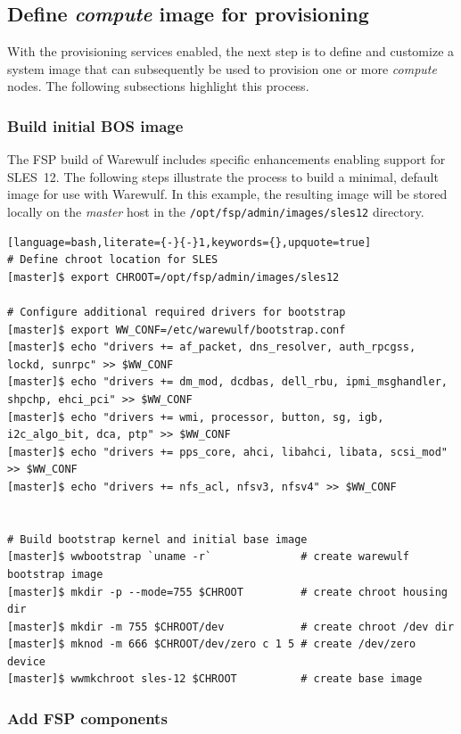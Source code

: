 \documentclass[letterpaper]{article}
\begin{document}
\subsection{Define {\em compute} image for provisioning}

With the provisioning services enabled, the next step is to define and
customize a system image that can subsequently be used to provision one or more
{\em compute} nodes. The following subsections highlight this process.

\subsubsection{Build initial BOS image}

The FSP build of Warewulf includes specific enhancements enabling support for
SLES~12. The following steps illustrate the process to build a minimal, default
image for use with Warewulf. In this example, the resulting image will be
stored locally on the {\em master} host in the
\texttt{/opt/fsp/admin/images/sles12} directory.

\begin{lstlisting}[language=bash,literate={-}{-}1,keywords={},upquote=true]
# Define chroot location for SLES 
[master]$ export CHROOT=/opt/fsp/admin/images/sles12

# Configure additional required drivers for bootstrap
[master]$ export WW_CONF=/etc/warewulf/bootstrap.conf
[master]$ echo "drivers += af_packet, dns_resolver, auth_rpcgss, lockd, sunrpc" >> $WW_CONF
[master]$ echo "drivers += dm_mod, dcdbas, dell_rbu, ipmi_msghandler, shpchp, ehci_pci" >> $WW_CONF
[master]$ echo "drivers += wmi, processor, button, sg, igb, i2c_algo_bit, dca, ptp" >> $WW_CONF
[master]$ echo "drivers += pps_core, ahci, libahci, libata, scsi_mod" >> $WW_CONF
[master]$ echo "drivers += nfs_acl, nfsv3, nfsv4" >> $WW_CONF


# Build bootstrap kernel and initial base image
[master]$ wwbootstrap `uname -r`              # create warewulf bootstrap image
[master]$ mkdir -p --mode=755 $CHROOT         # create chroot housing dir
[master]$ mkdir -m 755 $CHROOT/dev            # create chroot /dev dir
[master]$ mknod -m 666 $CHROOT/dev/zero c 1 5 # create /dev/zero device
[master]$ wwmkchroot sles-12 $CHROOT          # create base image

\end{lstlisting}

\subsubsection{Add FSP components}
\end{document}
